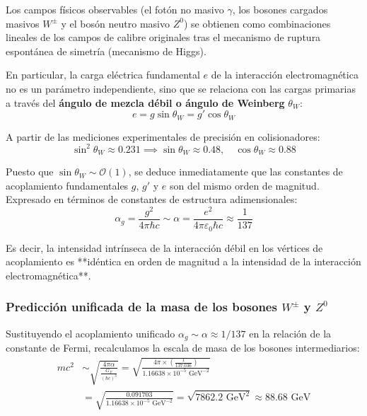 Los campos físicos observables (el fotón no masivo $\gamma$, los bosones cargados masivos $W^\pm$ y el bosón neutro masivo $Z^0$) se obtienen como combinaciones lineales de los campos de calibre originales tras el mecanismo de ruptura espontánea de simetría (mecanismo de Higgs). 

En particular, la carga eléctrica fundamental $e$ de la interacción electromagnética no es un parámetro independiente, sino que se relaciona con las cargas primarias a través del \textbf{ángulo de mezcla débil o ángulo de Weinberg} $\theta_W$:
\begin{equation}
    e = g \sin\theta_W = g' \cos\theta_W
\end{equation}

A partir de las mediciones experimentales de precisión en colisionadores:
\begin{equation}
    \sin^2\theta_W \approx 0.231 \implies \sin\theta_W \approx 0.48, \quad \cos\theta_W \approx 0.88
\end{equation}

Puesto que $\sin\theta_W \sim \mathcal{O}(1)$, se deduce inmediatamente que las constantes de acoplamiento fundamentales $g$, $g'$ y $e$ son del mismo orden de magnitud. Expresado en términos de constantes de estructura adimensionales:
\begin{equation}
    \alpha_g = \frac{g^2}{4\pi \hbar c} \sim \alpha = \frac{e^2}{4\pi \varepsilon_0 \hbar c} \approx \frac{1}{137}
\end{equation}

Es decir, la intensidad intrínseca de la interacción débil en los vértices de acoplamiento es **idéntica en orden de magnitud a la intensidad de la interacción electromagnética**.

\newpage
\subsubsection{Predicción unificada de la masa de los bosones $W^\pm$ y $Z^0$}

Sustituyendo el acoplamiento unificado $\alpha_g \sim \alpha \approx 1/137$ en la relación de la constante de Fermi, recalculamos la escala de masa de los bosones intermediarios:
\begin{align}
    mc^2 &\sim \sqrt{\frac{4\pi \alpha}{\frac{G_F}{(\hbar c)^3}}} = \sqrt{\frac{4\pi \times \left( \frac{1}{137.036} \right)}{1.16638 \times 10^{-5} \text{ GeV}^{-2}}} \nonumber \\
    &= \sqrt{\frac{0.091703}{1.16638 \times 10^{-5} \text{ GeV}^{-2}}} = \sqrt{7862.2 \text{ GeV}^2} \approx 88.68 \text{ GeV}
\end{align}

